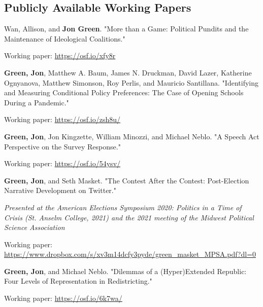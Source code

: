\documentclass[letterpaper]{article}
\renewenvironment{itemize}{
  \begin{list}{}{
    \setlength{\leftmargin}{1.5em}
  }
}{
  \end{list}
}
\begin{document}
\subsection*{Publicly Available Working Papers}

\begin{itemize}
\item Wan, Allison, and \textbf{Jon Green}. "More than a Game: Political Pundits and the Maintenance of Ideological Coalitions." 
\begin{itemize}
\item Working paper: \url{https://osf.io/xfy8r}
\end{itemize}

\item  \textbf{Green, Jon}, Matthew A. Baum, James N. Druckman, David Lazer, Katherine Ognyanova, Matthew Simonson, Roy Perlis, and Mauricio Santillana. "Identifying and Measuring Conditional Policy Preferences: The Case of Opening Schools During a Pandemic." 
\begin{itemize}
\item Working paper: \url{https://osf.io/zsh8u/}
\end{itemize}

\item \textbf{Green, Jon}, Jon Kingzette, William Minozzi, and Michael Neblo. "A Speech Act Perspective on the Survey Response." 
\begin{itemize}
\item Working paper: \url{https://osf.io/54ysv/}
\end{itemize}

\item \textbf{Green, Jon}, and Seth Masket. "The Contest After the Contest: Post-Election Narrative Development on Twitter." 
\begin{itemize}
\item \textit{Presented at the American Elections Symposium 2020: Politics in a Time of Crisis (St. Anselm College, 2021) and the 2021 meeting of the Midwest Political Science Association}
\item Working paper: \url{https://www.dropbox.com/s/xv3m14dcfy3pyde/green_masket_MPSA.pdf?dl=0}
\end{itemize}

\item \textbf{Green, Jon}, and Michael Neblo. "Dilemmas of a (Hyper)Extended Republic: Four Levels of Representation in Redistricting." 
\begin{itemize}
\item Working paper: \url{https://osf.io/6k7wa/}
\end{itemize}

\end{itemize}
\end{document}
